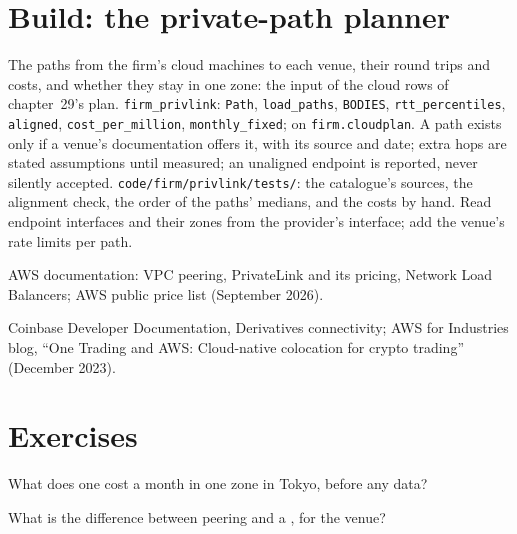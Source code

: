 \section{Build: the private-path planner}\label{bld:nw:private-connectivity-to-crypto-venues:privlink}

\begin{build}
 The paths from the firm's cloud machines to each venue, their round trips and costs, and whether they stay in one zone: the input of
the cloud rows of chapter~29's plan.
 \texttt{firm\_privlink}: \texttt{Path}, \texttt{load\_paths}, \texttt{BODIES}, \texttt{rtt\_percentiles}, \texttt{aligned},
\texttt{cost\_per\_million}, \texttt{monthly\_fixed}; on \texttt{firm.cloudplan}.
 A path exists only if a venue's documentation offers it, with its source and date; extra hops are stated assumptions until measured; an
unaligned endpoint is reported, never silently accepted.
 \texttt{code/firm/privlink/tests/}: the catalogue's sources, the alignment check, the order of the paths' medians, and the
costs by hand.
 Read endpoint interfaces and their zones from the provider's interface; add the venue's rate limits per path.
\end{build}

\begin{omsources}
\item AWS documentation: VPC peering, PrivateLink and its pricing, Network Load Balancers; AWS public price list (September 2026).
\item Coinbase Developer Documentation, Derivatives connectivity; AWS for Industries blog, ``One Trading and AWS: Cloud-native colocation for crypto
trading'' (December 2023).
\end{omsources}

\section{Exercises}

\begin{exercise}[$\star$]\label{exo:nw:private-connectivity-to-crypto-venues:1}
What does one  cost a month in one zone in Tokyo, before any data?
\end{exercise}

\begin{exercise}[$\star$]\label{exo:nw:private-connectivity-to-crypto-venues:2}
What is the difference between peering and a , for the venue?
\end{exercise}

